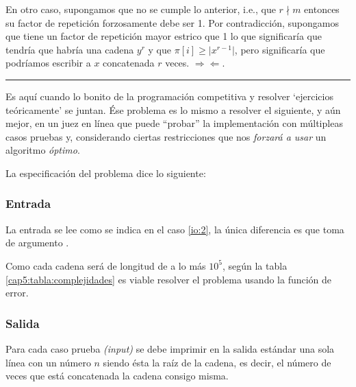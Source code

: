 En otro caso, supongamos que no se cumple lo anterior, i.e., que $r \nmid m$ entonces su factor de
repetición forzosamente debe ser 1. Por contradicción, supongamos que tiene un factor de repetición
mayor estrico que 1 lo que significaría que tendría que habría una cadena $y^r$ y que
$\pi[i] \geq \vert x^{r-1} \vert$, pero significaría que podríamos escribir a $x$ concatenada $r$
veces. $\Rightarrow\!\Leftarrow$.

\noindent\rule{\textwidth}{1pt}

Es aquí cuando lo bonito de la programación competitiva y resolver `ejercicios teóricamente' se
juntan. Ése problema es lo mismo a resolver el siguiente, y aún mejor, en un juez en línea que
puede ``probar'' la implementación con múltipleas casos pruebas y, considerando ciertas
restricciones que nos \textit{forzará a usar} un algoritmo \textit{óptimo}.


La especificación del problema dice lo siguiente:



\subsubsection{Entrada}
La entrada se lee como se indica en el caso \ref{io:2}, la única diferencia es que
 toma de argumento .

Como cada cadena será de longitud de a lo más $10^5$, según la tabla
\ref{cap5:tabla:complejidades} es viable resolver el problema usando la función de error.

\subsubsection{Salida}
Para cada caso prueba \textit{(input)} se debe imprimir en la salida estándar una sola línea con un
número $n$ siendo ésta la raíz de la cadena, es decir, el número de veces que está concatenada la
cadena consigo misma.

